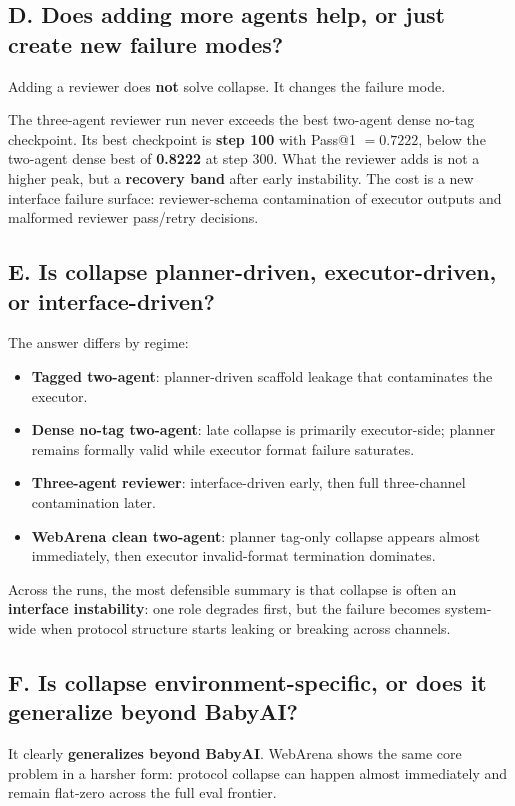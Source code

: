 \documentclass{ieeeaccess}
\begin{document}
\subsection{D. Does adding more agents help, or just create new failure modes?}
Adding a reviewer does \textbf{not} solve collapse. It changes the failure mode.

The three-agent reviewer run never exceeds the best two-agent dense no-tag checkpoint. Its best checkpoint is \textbf{step 100} with Pass@1 $=0.7222$, below the two-agent dense best of \textbf{0.8222} at step 300. What the reviewer adds is not a higher peak, but a \textbf{recovery band} after early instability. The cost is a new interface failure surface: reviewer-schema contamination of executor outputs and malformed reviewer pass/retry decisions.

\subsection{E. Is collapse planner-driven, executor-driven, or interface-driven?}
The answer differs by regime:
\begin{itemize}
\item \textbf{Tagged two-agent}: planner-driven scaffold leakage that contaminates the executor.
\item \textbf{Dense no-tag two-agent}: late collapse is primarily executor-side; planner remains formally valid while executor format failure saturates.
\item \textbf{Three-agent reviewer}: interface-driven early, then full three-channel contamination later.
\item \textbf{WebArena clean two-agent}: planner tag-only collapse appears almost immediately, then executor invalid-format termination dominates.
\end{itemize}

Across the runs, the most defensible summary is that collapse is often an \textbf{interface instability}: one role degrades first, but the failure becomes system-wide when protocol structure starts leaking or breaking across channels.

\subsection{F. Is collapse environment-specific, or does it generalize beyond BabyAI?}
It clearly \textbf{generalizes beyond BabyAI}. WebArena shows the same core problem in a harsher form: protocol collapse can happen almost immediately and remain flat-zero across the full eval frontier.
\end{document}

